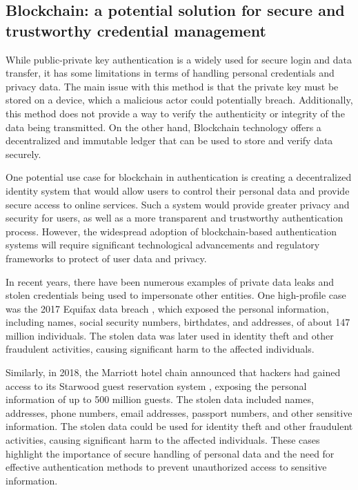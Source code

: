 \documentclass[target=mst,aauheader=]{thud}
\begin{document}
\subsection{Blockchain: a potential solution for secure and trustworthy credential management}

While public-private key authentication is a widely used for secure login and data transfer, it has some limitations in terms of handling personal credentials and privacy data. The main issue with this method is that the private key must be stored on a device, which a malicious actor could potentially breach. Additionally, this method does not provide a way to verify the authenticity or integrity of the data being transmitted. On the other hand, Blockchain technology offers a decentralized and immutable ledger that can be used to store and verify data securely.

One potential use case for blockchain in authentication is creating a decentralized identity system that would allow users to control their personal data and provide secure access to online services. Such a system would provide greater privacy and security for users, as well as a more transparent and trustworthy authentication process. However, the widespread adoption of blockchain-based authentication systems will require significant technological advancements and regulatory frameworks to protect of user data and privacy.


In recent years, there have been numerous examples of private data leaks and stolen credentials being used to impersonate other entities. One high-profile case was the 2017 Equifax data breach \cite{equifaxDataBreachSettlement}, which exposed the personal information, including names, social security numbers, birthdates, and addresses, of about 147 million individuals. The stolen data was later used in identity theft and other fraudulent activities, causing significant harm to the affected individuals.

Similarly, in 2018, the Marriott hotel chain announced that hackers had gained access to its Starwood guest reservation system \cite{marriotDataBreach}, exposing the personal information of up to 500 million guests. The stolen data included names, addresses, phone numbers, email addresses, passport numbers, and other sensitive information. The stolen data could be used for identity theft and other fraudulent activities, causing significant harm to the affected individuals. These cases highlight the importance of secure handling of personal data and the need for effective authentication methods to prevent unauthorized access to sensitive information.
\end{document}
